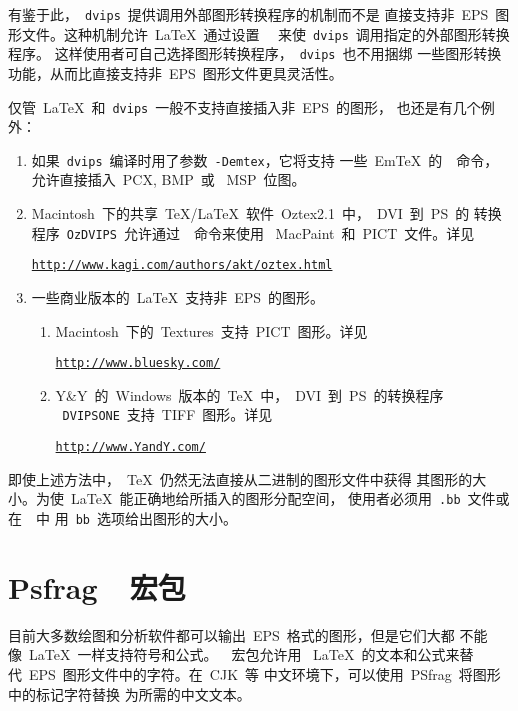 有鉴于此，~\texttt{dvips}~提供调用外部图形转换程序的机制而不是
直接支持非~EPS~图形文件。这种机制允许~\LaTeX{}~通过设置
~~来使~\texttt{dvips}~调用指定的外部图形转换程序。
这样使用者可自己选择图形转换程序，~\texttt{dvips}~也不用捆绑
一些图形转换功能，从而比直接支持非~EPS~图形文件更具灵活性。

仅管~\LaTeX{}~和~\texttt{dvips}~一般不支持直接插入非~EPS~的图形，
也还是有几个例外：

\begin{enumerate}
\item 如果~\texttt{dvips}~编译时用了参数~\texttt{-Demtex}，它将支持
      一些~Em\TeX{}~的~~命令，允许直接插入~PCX, BMP~或
      ~MSP~位图。
\item Macintosh~下的共享~\TeX/\LaTeX{}~软件~Oztex2.1~中，~DVI~到~PS~的
      转换程序~\texttt{OzDVIPS}~允许通过~~命令来使用
      ~MacPaint~和~PICT~文件。详见

      \href{http://www.kagi.com/authors/akt/oztex.html}{%
       \texttt{http://www.kagi.com/authors/akt/oztex.html}}
\item 一些商业版本的~\LaTeX{}~支持非~EPS~的图形。
     \begin{enumerate}
     \item Macintosh~下的~Textures~支持~PICT~图形。详见

        \href{http://www.bluesky.com/}{\texttt{http://www.bluesky.com/}}
    \item Y{\&}Y~的~Windows~版本的~\TeX{}~中，~DVI~到~PS~的转换程序
          ~\texttt{DVIPSONE}~支持~TIFF~图形。详见

          \href{http://www.YandY.com/}{\texttt{http://www.YandY.com/}}
    \end{enumerate}
\end{enumerate}

即使上述方法中，~\TeX{}~仍然无法直接从二进制的图形文件中获得
其图形的大小。为使~\LaTeX{}~能正确地给所插入的图形分配空间，
使用者必须用~\texttt{.bb}~文件或在~~中
用~\texttt{bb}~选项给出图形的大小。

\section{Psfrag~~宏包}\label{sec:psfrag}

目前大多数绘图和分析软件都可以输出~EPS~格式的图形，但是它们大都
不能像~\LaTeX{}~一样支持符号和公式。~~宏包允许用
~\LaTeX{}~的文本和公式来替代~EPS~图形文件中的字符。在~CJK~等
中文环境下，可以使用~\textsf{PSfrag}~将图形中的标记字符替换
为所需的中文文本。


